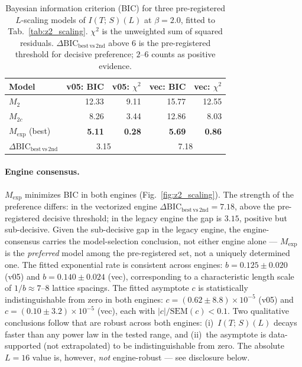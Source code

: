 \documentclass[aps,pra,twocolumn,superscriptaddress,showpacs,floatfix]{revtex4-2}
\newcommand{\MI}{I(T;\,S)}
\begin{document}
\begin{table}[b]
\caption{Bayesian information criterion (BIC) for three pre-registered
$L$-scaling models of $\MI(L)$ at $\beta=2.0$, fitted to
Tab.~\ref{tab:z2_scaling}. $\chi^2$ is the unweighted sum of squared
residuals. $\Delta\mathrm{BIC}_\mathrm{best\,vs\,2nd}$ above $6$ is the
pre-registered threshold for decisive preference; $2$--$6$ counts as positive
evidence.}
\label{tab:z2_bic}
\begin{ruledtabular}
\begin{tabular}{lrrrr}
Model & v05: BIC & v05: $\chi^2$ & vec: BIC & vec: $\chi^2$ \\
\hline
$M_2$                            & 12.33         & 9.11         & 15.77         & 12.55 \\
$M_{2c}$                         &  8.26         & 3.44         & 12.86         &  8.03 \\
$M_\mathrm{exp}$ (best)          & \textbf{5.11} & \textbf{0.28} & \textbf{5.69} & \textbf{0.86} \\
\hline
$\Delta\mathrm{BIC}_\mathrm{best\,vs\,2nd}$ & \multicolumn{2}{c}{3.15} & \multicolumn{2}{c}{7.18} \\
\end{tabular}
\end{ruledtabular}
\end{table}

\paragraph{Engine consensus.}
$M_\mathrm{exp}$ minimizes BIC in both engines (Fig.~\ref{fig:z2_scaling}). The strength of the preference
differs: in the vectorized engine
$\Delta\mathrm{BIC}_\mathrm{best\,vs\,2nd} = 7.18$, above the pre-registered
decisive threshold; in the legacy engine the gap is $3.15$, positive but
sub-decisive. Given the sub-decisive gap in the legacy engine, the
engine-consensus carries the model-selection conclusion, not either engine
alone --- $M_\mathrm{exp}$ is the \emph{preferred} model among the
pre-registered set, not a uniquely determined one. The fitted exponential rate
is consistent across engines: $b = 0.125 \pm 0.020$ (v05) and
$b = 0.140 \pm 0.024$ (vec), corresponding to a characteristic length scale of
$1/b \approx 7$--$8$ lattice spacings. The fitted asymptote $c$ is statistically
indistinguishable from zero in both engines:
$c = (0.62 \pm 8.8) \times 10^{-5}$ (v05) and
$c = (0.10 \pm 3.2) \times 10^{-5}$ (vec), each with
$|c|/\mathrm{SEM}(c) < 0.1$. Two qualitative conclusions follow that are
robust across both engines: (i)~$\MI(L)$ decays faster than any power law
in the tested range, and (ii)~the asymptote is data-supported (not
extrapolated) to be indistinguishable from zero. The absolute $L=16$ value
is, however, \emph{not} engine-robust --- see disclosure below.
\end{document}
